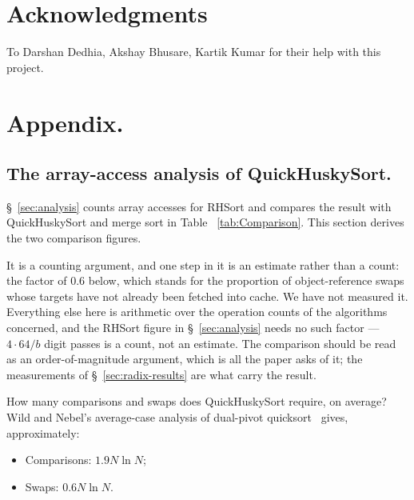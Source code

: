 \documentclass[twoside,leqno,twocolumn]{article}
\newif\ifanonymous
\begin{document}
\ifanonymous\else
  \section*{Acknowledgments}
  To Darshan Dedhia, Akshay Bhusare, Kartik Kumar for their help with this project.
\fi






\appendix
\section{Appendix.}
\subsection{The array-access analysis of QuickHuskySort.}
\label{sec:qhs-analysis}

\S~\ref{sec:analysis} counts array accesses for RHSort and compares the result with QuickHuskySort and
merge sort in Table ~\ref{tab:Comparison}. This section derives the two comparison figures.

It is a counting argument, and one step in it is an estimate rather than a count: the factor of 0.6
below, which stands for the proportion of object-reference swaps whose targets have not already been
fetched into cache. We have not measured it. Everything else here is arithmetic over the operation
counts of the algorithms concerned, and the RHSort figure in \S~\ref{sec:analysis} needs no such
factor --- $4 \cdot 64/b$ digit passes is a count, not an estimate. The comparison should be read as an
order-of-magnitude argument, which is all the paper asks of it; the measurements of
\S~\ref{sec:radix-results} are what carry the result.

How many comparisons and swaps does QuickHuskySort require, on average?
Wild and Nebel's average-case analysis of dual-pivot quicksort~\cite{WildNebel12} gives, approximately:
\begin{itemize}
    \item Comparisons: $1.9 N \ln N$;
    \item Swaps: $0.6 N \ln N$.
\end{itemize}
\end{document}
